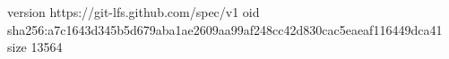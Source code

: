 version https://git-lfs.github.com/spec/v1
oid sha256:a7c1643d345b5d679aba1ae2609aa99af248cc42d830cac5eaeaf116449dca41
size 13564
